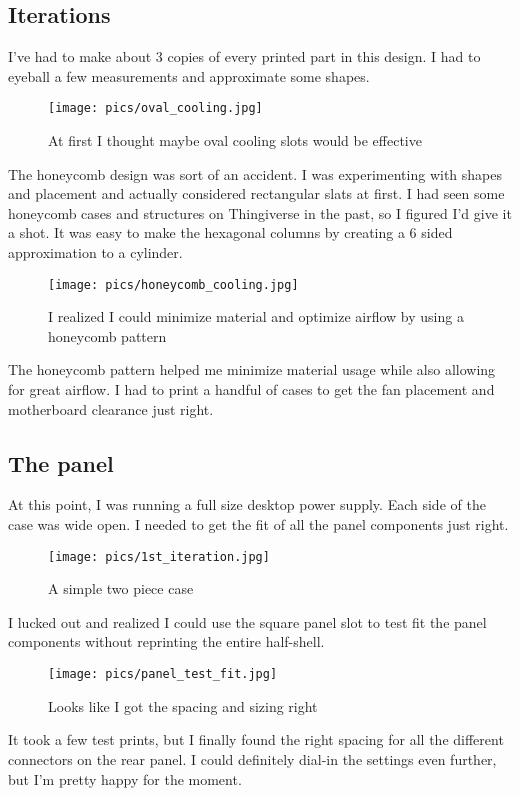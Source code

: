 \documentclass{article}
\begin{document}
\subsection{Iterations}
I've had to make about 3 copies of every printed part in this design. I had to eyeball a few measurements and approximate some shapes. 
\begin{figure}[h]
\texttt{[image: pics/oval\_cooling.jpg]}
\caption{At first I thought maybe oval cooling slots would be effective}
\end{figure}
The honeycomb design was sort of an accident. I was experimenting with shapes and placement and actually considered rectangular slats at first. I had seen some honeycomb cases and structures on Thingiverse in the past, so I figured I'd give it a shot. It was easy to make the hexagonal columns by creating a 6 sided approximation to a cylinder.

\begin{figure}[h]
\texttt{[image: pics/honeycomb\_cooling.jpg]}
\caption{I realized I could minimize material and optimize airflow by using a honeycomb pattern}
\end{figure}
The honeycomb pattern helped me minimize material usage while also allowing for great airflow. I had to print a handful of cases to get the fan placement and motherboard clearance just right.

\subsection{The panel}
At this point, I was running a full size desktop power supply. Each side of the case was wide open. I needed to get the fit of all the panel components just right.
\begin{figure}[h]
\texttt{[image: pics/1st\_iteration.jpg]}
\caption{A simple two piece case}
\end{figure}

I lucked out and realized I could use the square panel slot to test fit the panel components without reprinting the entire half-shell.

\begin{figure}[h]
\texttt{[image: pics/panel\_test\_fit.jpg]}
\caption{Looks like I got the spacing and sizing right}
\end{figure}

It took a few test prints, but I finally found the right spacing for all the different connectors on the rear panel. I could definitely dial-in the settings even further, but I'm pretty happy for the moment.
\end{document}
